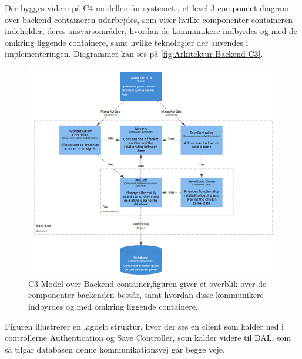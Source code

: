 Der bygges videre på C4 modellen for systemet , et level 3 component diagram over backend containeren udarbejdes, som viser hvilke componenter containeren indeholder, deres ansvarsområder, hvordan de kommunikere indbyrdes og med de omkring liggende containere, samt hvilke teknologier der anvendes i implementeringen. Diagrammet kan ses på \autoref{fig:Arkitektur-Backend-C3}. 


\begin{figure}[H]
\centering
\includegraphics[width = \textwidth]{02-Body/Images/Backend_C3.PNG}
\caption{C3-Model over Backend container,figuren giver et overblik over de componenter backenden består, samt hvordan disse kommunikere indbyrdes og med omkring liggende containere.}
\label{fig:Arkitektur-Backend-C3}
\end{figure}

Figuren illustrerer en lagdelt struktur, hvor der ses en client som kalder ned i controllerne Authentication og Save Controller, som kalder videre til DAL, som så tilgår databasen denne kommunikationsvej går begge veje.

